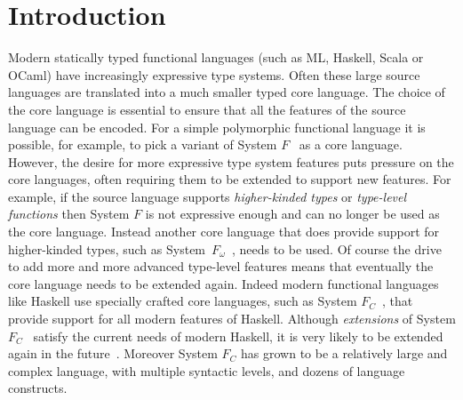 \section{Introduction}

Modern statically typed functional languages (such as ML, Haskell,
Scala or OCaml) have increasingly expressive type systems. Often these
large source languages are translated into a much smaller typed core
language. The choice of the core language is essential to ensure that
all the features of the source language can be encoded. For a simple
polymorphic functional language it is possible, for example, to pick a
variant of System $F$~\cite{systemfw,Reynolds:1974} as a core
language. However, the desire for more expressive type system features
puts pressure on the core languages, often requiring them to be
extended to support new features.  For example, if the source language
supports \emph{higher-kinded types} or \emph{type-level functions}
then System $F$ is not expressive enough and can no longer be used as
the core language. Instead another core language that does provide
support for higher-kinded types, such as
System~$F_{\omega}$~\cite{systemfw}, needs to be used. Of course the
drive to add more and more advanced type-level features means that
eventually the core language needs to be extended again. Indeed modern
functional languages like Haskell use specially crafted core
languages, such as System $F_{C}$~\cite{fc}, that provide support for all
modern features of Haskell. Although \emph{extensions} of System
$F_{C}$~\cite{Yorgey:2012,Eisenberg:2014} satisfy the current needs of
modern Haskell, it is very likely to be extended again in the
future~\cite{fc:kind}. Moreover System $F_{C}$ has grown to be a relatively
large and complex language, with multiple syntactic levels, and dozens
of language constructs.

\begin{comment}
However System~$F_{\omega}$ is
significantly more complex than System F and thus harder to
maintain. If later a new feature, such as \emph{kind polymorphism}, is
desired the core language may need to be changed again to account for
the new feature, introducing at the same time new sources of
complexity. Indeed the core language for modern versions of 
functional languages are quite complex, having multiple syntactic 
sorts (such as terms, types and kinds), as well as dozens of 
language constructs~\cite{}\bruno{$F_{C}$}. 
\end{comment}


